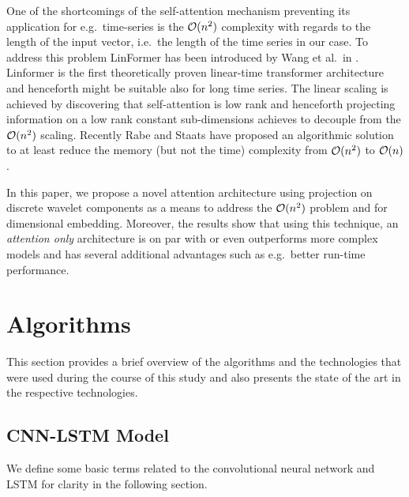 \documentclass{ieeeaccess}
\begin{document}
One of the shortcomings of the self-attention mechanism preventing its application for e.g.\ time-series is the  ${\cal O}(n^2)$ complexity with regards to the length of the input vector, i.e.\ the length of the time series in our case. To address this problem LinFormer has been introduced by Wang et al.\ in \cite{WangEtAl}. Linformer is the first theoretically proven linear-time transformer architecture and henceforth might be suitable also for long time series. The linear scaling is achieved by discovering that self-attention is low rank and henceforth projecting information on a low rank constant sub-dimensions achieves to decouple from the ${\cal O}(n^2)$ scaling. Recently Rabe and Staats \cite{RabeStaats} have proposed an algorithmic solution to at least reduce the memory (but not the time) complexity from  ${\cal O}(n^2)$ to  ${\cal O}(n)$.

In this paper, we propose a novel attention architecture using projection on discrete wavelet components as a means to address the ${\cal O}(n^2)$ problem and for dimensional embedding. Moreover, the results show that using this technique, an \emph{attention only} architecture is on par with or even outperforms more complex models and has several additional advantages such as e.g.\ better run-time performance.


\section{Algorithms}
This section provides a brief overview of the algorithms and the technologies that were used during the course of this study and also presents the state of the art in the respective technologies.

\subsection{CNN-LSTM Model}
We define some basic terms related to the convolutional neural network and LSTM for clarity in the following section.
\end{document}
